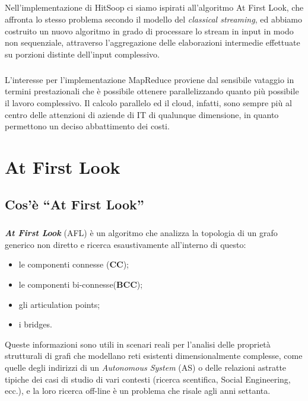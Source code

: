 \documentclass[a4paper,11pt]{report}
\begin{document}
\paragraph{}
Nell'implementazione di HitSoop ci siamo ispirati all'algoritmo At First Look, che affronta lo stesso problema secondo il modello del
\emph{classical streaming},
ed abbiamo costruito un nuovo algoritmo in grado di processare lo stream in input in modo non sequenziale, attraverso l'aggregazione delle
elaborazioni intermedie effettuate su porzioni
distinte dell'input complessivo. 
\paragraph{}
L'interesse per l'implementazione MapReduce proviene dal sensibile vataggio in termini prestazionali che è possibile ottenere
parallelizzando quanto più possibile
il lavoro complessivo. Il calcolo parallelo ed il cloud, infatti, sono sempre più al centro delle attenzioni di aziende di IT di qualunque
dimensione, in quanto permettono
un deciso abbattimento dei costi. 

\chapter{At First Look}\label{At First Look}
\section{Cos'è ``At First Look'' }
\paragraph{}
\emph{\textbf{At First Look}} (AFL) è un algoritmo che analizza la topologia di un grafo generico non diretto e ricerca esaustivamente
all'interno di questo:
\begin{itemize}
 \item le componenti connesse (\textbf{CC});
 \item le componenti bi-connesse(\textbf{BCC});
 \item gli articulation points;
 \item i bridges.
\end{itemize}
\par
Queste informazioni sono utili in scenari reali per l'analisi delle proprietà strutturali di grafi che modellano reti esistenti
dimensionalmente complesse,
come quelle degli indirizzi di un \emph{Autonomous System} (AS) o delle relazioni astratte tipiche dei casi di studio di vari contesti
(ricerca scentifica, Social Engineering, ecc.),
e la loro ricerca off-line è un problema che risale agli anni settanta.
\end{document}
